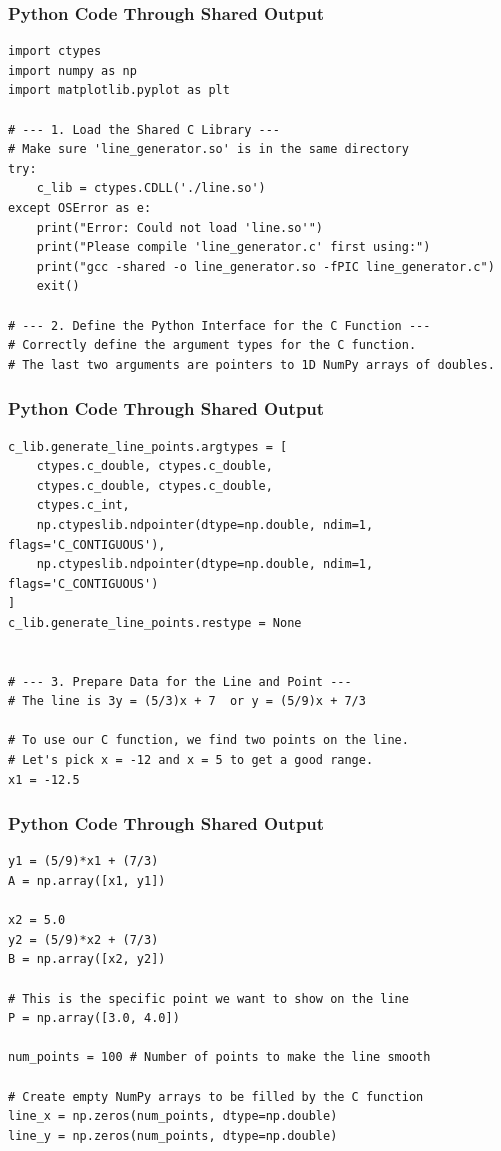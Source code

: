 \documentclass{beamer}
\begin{document}
\begin{frame}[fragile]
\frametitle{Python Code Through Shared Output}
\begin{lstlisting}
import ctypes
import numpy as np
import matplotlib.pyplot as plt

# --- 1. Load the Shared C Library ---
# Make sure 'line_generator.so' is in the same directory
try:
    c_lib = ctypes.CDLL('./line.so')
except OSError as e:
    print("Error: Could not load 'line.so'")
    print("Please compile 'line_generator.c' first using:")
    print("gcc -shared -o line_generator.so -fPIC line_generator.c")
    exit()

# --- 2. Define the Python Interface for the C Function ---
# Correctly define the argument types for the C function.
# The last two arguments are pointers to 1D NumPy arrays of doubles.
\end{lstlisting}    
\end{frame}
\begin{frame}[fragile]
\frametitle{Python Code Through Shared Output}
\begin{lstlisting}
c_lib.generate_line_points.argtypes = [
    ctypes.c_double, ctypes.c_double,
    ctypes.c_double, ctypes.c_double,
    ctypes.c_int,
    np.ctypeslib.ndpointer(dtype=np.double, ndim=1, flags='C_CONTIGUOUS'),
    np.ctypeslib.ndpointer(dtype=np.double, ndim=1, flags='C_CONTIGUOUS')
]
c_lib.generate_line_points.restype = None


# --- 3. Prepare Data for the Line and Point ---
# The line is 3y = (5/3)x + 7  or y = (5/9)x + 7/3

# To use our C function, we find two points on the line.
# Let's pick x = -12 and x = 5 to get a good range.
x1 = -12.5
\end{lstlisting}    
\end{frame}
\begin{frame}[fragile]
\frametitle{Python Code Through Shared Output}
\begin{lstlisting}
y1 = (5/9)*x1 + (7/3)
A = np.array([x1, y1])

x2 = 5.0
y2 = (5/9)*x2 + (7/3)
B = np.array([x2, y2])

# This is the specific point we want to show on the line
P = np.array([3.0, 4.0])

num_points = 100 # Number of points to make the line smooth

# Create empty NumPy arrays to be filled by the C function
line_x = np.zeros(num_points, dtype=np.double)
line_y = np.zeros(num_points, dtype=np.double)

\end{lstlisting}    
\end{frame}
\end{document}
